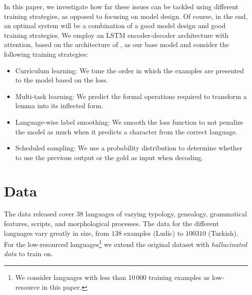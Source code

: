\documentclass[11pt,a4paper]{article}
\begin{document}
In this paper, we investigate how far these issues can be tackled
using different training strategies, as opposed to focusing on model
design. Of course, in the end, an optimal system will be a
combination of a good model design and good training strategies.
%
We employ an LSTM encoder-decoder architecture with attention, based on
the architecture of , as our
base model and consider the following training strategies:

\begin{itemize}
\item Curriculum learning: We tune the order in which the examples are presented to the model based on the loss.
\item Multi-task learning: We predict the formal operations required to transform a lemma into its inflected form.
\item Language-wise label smoothing: We smooth the loss function to not penalize the model as much when it predicts a character from the correct language.
\item Scheduled sampling: We use a probability distribution to determine whether to use the previous output or the gold as input when decoding.
\end{itemize}

%


\section{Data}

The data released cover $38$ languages of varying typology, genealogy,
grammatical features, scripts, and morphological processes. The data
for the different languages vary greatly in size, from $138$ examples
(Ludic) to $100310$ (Turkish).  For the low-resourced
languages\footnote{We consider languages with less than 10\,000
training examples as low-resource in this paper.} we extend the
original dataset with \emph{hallucinated data}
\cite{DBLP:conf/emnlp/AnastasopoulosN19} to train on.
\end{document}
